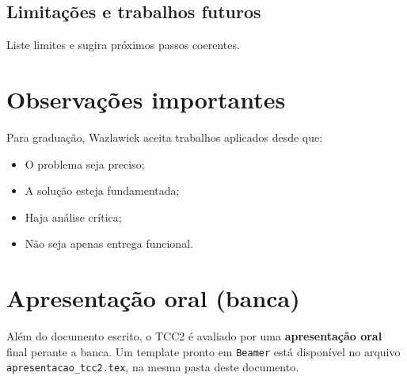 \documentclass[
    12pt,                %
    openright,           %
    oneside,             %
    a4paper,             %
    english,             %
    brazil               %
]{abntex2}
\begin{document}
\section{Limitações e trabalhos futuros}
Liste limites e sugira próximos passos coerentes.

\chapter*{Observações importantes}

Para graduação, Wazlawick aceita trabalhos aplicados desde que:
\begin{itemize}
    \item O problema seja preciso;
    \item A solução esteja fundamentada;
    \item Haja análise crítica;
    \item Não seja apenas entrega funcional.
\end{itemize}

\chapter*{Apresentação oral (banca)}

Além do documento escrito, o TCC2 é avaliado por uma \textbf{apresentação oral} final perante a banca. Um template pronto em \texttt{Beamer} está disponível no arquivo \texttt{apresentacao\_tcc2.tex}, na mesma pasta deste documento.
\end{document}
